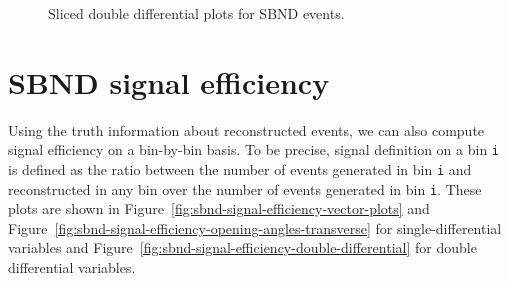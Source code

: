 \documentclass{article}
\begin{document}
\begin{figure}
    \caption{Sliced double differential plots for SBND events.}
    \label{fig:sbnd-double-diff-sliced}
\end{figure}

\section{SBND signal efficiency}

Using the truth information about reconstructed events, we can also compute signal efficiency on a bin-by-bin basis. To be precise, signal definition on a bin \verb|i| is defined as the ratio between the number of events generated in bin \verb|i| and reconstructed in any bin over the number of events generated in bin \verb|i|. These plots are shown in Figure~\ref{fig:sbnd-signal-efficiency-vector-plots} and Figure~\ref{fig:sbnd-signal-efficiency-opening-angles-transverse} for single-differential variables and Figure~\ref{fig:sbnd-signal-efficiency-double-differential} for double differential variables.
\end{document}
